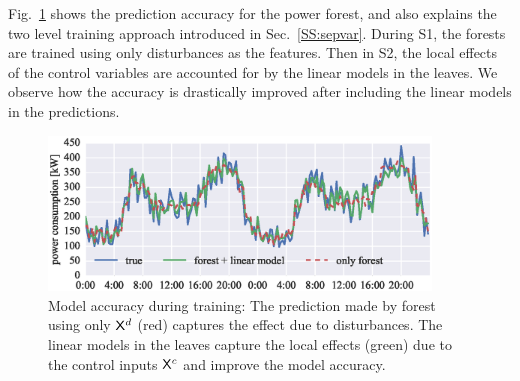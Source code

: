 Fig.~\ref{F:sepvars} shows the prediction accuracy for the power forest, and also explains the two level training approach introduced in Sec.~\ref{SS:sepvar}. During S1, the forests are trained using only disturbances as the features. Then in S2, the local effects of the control variables are accounted for by the linear models in the leaves. We observe how the accuracy is drastically improved after including the linear models in the predictions.

\begin{figure}[h!]
	\centering
	\includegraphics[width=24pc]{figures/eplus_validation.eps}	
	\caption{Model accuracy during training: The prediction made by forest using only $\mathsf{X}^d$ (red) captures the effect due to disturbances. The linear models in the leaves capture the local effects (green) due to the control inputs $\mathsf{X}^c$ and improve the model accuracy.}
	\label{F:sepvars}
	\captionsetup{justification=centering}
\end{figure}


